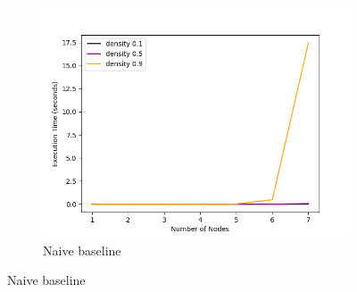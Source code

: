 \documentclass[sigplan,review,nonacm=true]{acmart}
\begin{document}
\begin{figure}
    \begin{subfigure}{\linewidth}
      \includegraphics[width=\linewidth]{timeVsSize_10_NaiveChecker.png}
      \caption{Naive baseline}
      \label{fig:sfigNa\"{i}veTvsS}
    \end{subfigure}

\end{figure}
\end{document}
